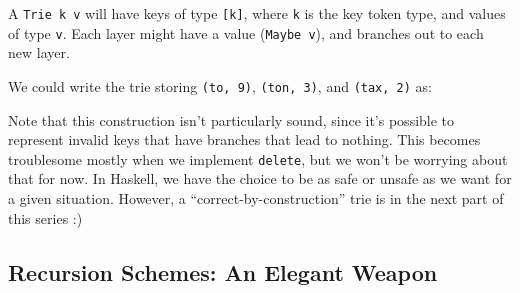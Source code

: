 \documentclass[]{article}
\newenvironment{Shaded}{}{}
\newcommand{\CharTok}[1]{\textcolor[rgb]{0.25,0.44,0.63}{#1}}
\newcommand{\CommentTok}[1]{\textcolor[rgb]{0.38,0.63,0.69}{\textit{#1}}}
\newcommand{\DataTypeTok}[1]{\textcolor[rgb]{0.56,0.13,0.00}{#1}}
\newcommand{\DecValTok}[1]{\textcolor[rgb]{0.25,0.63,0.44}{#1}}
\newcommand{\NormalTok}[1]{#1}
\newcommand{\OperatorTok}[1]{\textcolor[rgb]{0.40,0.40,0.40}{#1}}
\newcommand{\OtherTok}[1]{\textcolor[rgb]{0.00,0.44,0.13}{#1}}
\begin{document}
A \texttt{Trie\ k\ v} will have keys of type \texttt{{[}k{]}}, where \texttt{k}
is the key token type, and values of type \texttt{v}. Each layer might have a
value (\texttt{Maybe\ v}), and branches out to each new layer.

We could write the trie storing \texttt{(to,\ 9)}, \texttt{(ton,\ 3)}, and
\texttt{(tax,\ 2)} as:

\begin{Shaded}
\end{Shaded}

Note that this construction isn't particularly sound, since it's possible to
represent invalid keys that have branches that lead to nothing. This becomes
troublesome mostly when we implement \texttt{delete}, but we won't be worrying
about that for now. In Haskell, we have the choice to be as safe or unsafe as we
want for a given situation. However, a ``correct-by-construction'' trie is in
the next part of this series :)

\subsection{Recursion Schemes: An Elegant
Weapon}\label{recursion-schemes-an-elegant-weapon}
\end{document}
